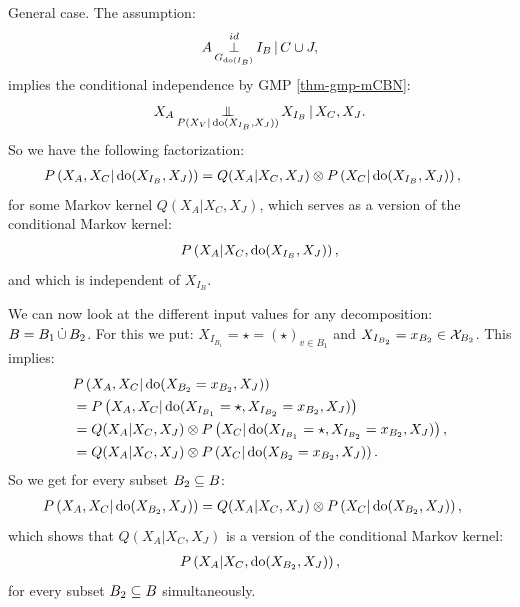 {\begin{enumerate}
    General case. The assumption:
  \[ A \operatorname*{\perp}^{id}_{G_{\operatorname{do}(I_B)}} I_B \operatorname*{|} C  \cup J,   \]
implies the conditional independence by GMP \ref{thm-gmp-mCBN}:
\[ X_A \operatorname*{\perp\mkern-11mu\perp}_{P(X_V|\operatorname{do}(X_{I_B},X_{J}))} X_{I_B} \operatorname*{|} X_C,X_J.\]
So we have the following factorization:
\begin{align*} 
    P\left ( X_A,X_C|\operatorname{do}(X_{I_B},X_{J})\right ) &= Q(X_A|X_C,X_J) \otimes P\left ( X_C|\operatorname{do}(X_{I_B},X_{J})\right ),
\end{align*}
for some Markov kernel $Q(X_A|X_C,X_J)$, which serves as a version of the conditional Markov kernel:
\[P\left ( X_A|X_C,\operatorname{do}(X_{I_B},X_{J})\right ),\]
and which is independent of $X_{I_B}$.

We can now look at the different input values for any decomposition: $B=B_1 \,\dot{\cup}\, B_2$.
For this we put: $X_{I_{B_1}}= \star = (\star)_{v \in B_1}$ and  $ X_{I_{B_2}}=x_{B_2} \in \mathcal{X}_{B_2}$.
This implies:
\begin{align*} 
  & P\left ( X_A,X_C|\operatorname{do}(X_{{B_2}}=x_{B_2},X_{J})\right ) \\
  &= P\left ( X_A,X_C|\operatorname{do}(X_{I_{B_1}}=\star,X_{I_{B_2}}=x_{B_2},X_{J})\right ) \\
  &= Q(X_A|X_C,X_J) \otimes P\left ( X_C|\operatorname{do}(X_{I_{B_1}}=\star,X_{I_{B_2}}=x_{B_2},X_{J})\right ),\\
  &= Q(X_A|X_C,X_J) \otimes P\left ( X_C|\operatorname{do}(X_{{B_2}}=x_{B_2},X_{J})\right ).
\end{align*}
So we get for every subset $B_2 \subseteq B$:
\begin{align*}
    P\left ( X_A,X_C|\operatorname{do}(X_{B_2},X_{J})\right ) &= Q(X_A|X_C,X_J) \otimes P\left ( X_C|\operatorname{do}(X_{B_2},X_{J})\right ),
\end{align*}
which shows that $Q(X_A|X_C,X_J)$ is a version of the conditional Markov kernel:
\begin{align*} 
P\left ( X_A|X_C,\operatorname{do}(X_{B_2},X_J)\right ),
\end{align*}
for every subset $B_2 \subseteq B$ simultaneously.


\end{enumerate}}
